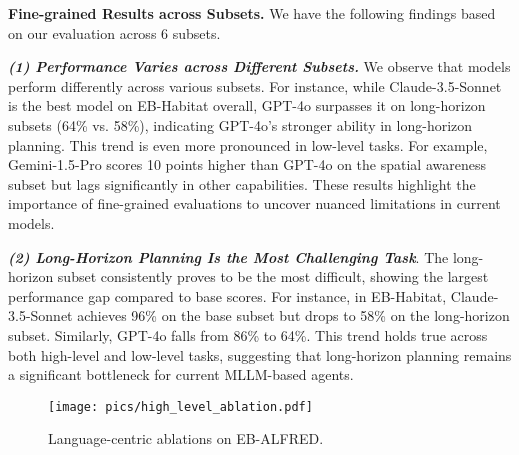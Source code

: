\textbf{Fine-grained Results across Subsets.}
We have the following findings based on our evaluation across 6 subsets.

\emph{\textbf{(1) Performance Varies across Different Subsets.}} We observe that models perform differently across various subsets. For instance, while Claude-3.5-Sonnet is the best model on EB-Habitat overall, GPT-4o surpasses it on long-horizon subsets (64\% vs. 58\%), indicating GPT-4o’s stronger ability in long-horizon planning. This trend is even more pronounced in low-level tasks. For example, Gemini-1.5-Pro scores 10 points higher than GPT-4o on the spatial awareness subset but lags significantly in other capabilities. These results highlight the importance of fine-grained evaluations to uncover nuanced limitations in current models.  

\emph{\textbf{(2) Long-Horizon Planning Is the Most Challenging Task}}. The long-horizon subset consistently proves to be the most difficult, showing the largest performance gap compared to base scores. For instance, in EB-Habitat, Claude-3.5-Sonnet achieves 96\% on the base subset but drops to 58\% on the long-horizon subset. Similarly, GPT-4o falls from 86\% to 64\%. This trend holds true across both high-level and low-level tasks, suggesting that long-horizon planning remains a significant bottleneck for current MLLM-based agents.




\begin{figure}[ht]
\begin{center}
\vspace{-5pt}
\texttt{[image: pics/high\_level\_ablation.pdf]}
\end{center}
\vspace{-10pt}
\caption{Language-centric ablations on EB-ALFRED.}
\vspace{-1.em}
\label{fig:high_level_ablation}
\end{figure} 


